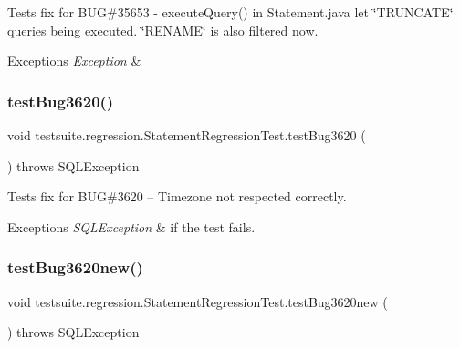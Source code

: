 Tests fix for B\+UG\#35653 -\/ execute\+Query() in Statement.\+java let \char`\"{}\+T\+R\+U\+N\+C\+A\+T\+E\char`\"{} queries being executed. \char`\"{}\+R\+E\+N\+A\+M\+E\char`\"{} is also filtered now.


\begin{DoxyExceptions}{Exceptions}
{\em Exception} & \\
\hline
\end{DoxyExceptions}
\mbox{\label{classtestsuite_1_1regression_1_1_statement_regression_test_aff7b0f7e5043e4a16d128d96ad607be6}} 
\subsubsection{\texorpdfstring{test\+Bug3620()}{testBug3620()}}
{\footnotesize\ttfamily void testsuite.\+regression.\+Statement\+Regression\+Test.\+test\+Bug3620 (\begin{DoxyParamCaption}{ }\end{DoxyParamCaption}) throws S\+Q\+L\+Exception}

Tests fix for B\+UG\#3620 -- Timezone not respected correctly.


\begin{DoxyExceptions}{Exceptions}
{\em S\+Q\+L\+Exception} & if the test fails. \\
\hline
\end{DoxyExceptions}
\mbox{\label{classtestsuite_1_1regression_1_1_statement_regression_test_a1e239d5a9f63b634b11ab2451ef579eb}} 
\subsubsection{\texorpdfstring{test\+Bug3620new()}{testBug3620new()}}
{\footnotesize\ttfamily void testsuite.\+regression.\+Statement\+Regression\+Test.\+test\+Bug3620new (\begin{DoxyParamCaption}{ }\end{DoxyParamCaption}) throws S\+Q\+L\+Exception}


